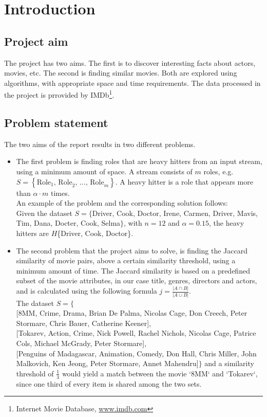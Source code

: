 
\section{Introduction}

\subsection{Project aim}
The project has two aims. The first is to discover interesting facts about actors, movies, etc. The second is finding similar movies. Both are explored using algorithms, with appropriate space and time requirements. The data processed in the project is prrovided by IMDb\footnote{Internet Movie Database, \url{www.imdb.com}}.

\subsection{Problem statement}
\label{sub:problem}
	The two aims of the report results in two different problems.
\begin{itemize}
	\item The first problem is finding roles that are heavy hitters from an input stream, using a minimum amount of space. A stream consists of \(m\) roles, e.g. \(S=\left\{\textrm{Role}_1 \textrm{, Role}_2 \textrm{, } \dots \textrm{, Role}_m\right\}\). A heavy hitter is a role that appears more than \(\alpha \cdot m\) times.\\
	An example of the problem and the corresponding solution follows: \\
	Given the dataset \(S = \{\)Driver, Cook, Doctor, Irene, Carmen, Driver, Mavis, Tim, Dana, Docter, Cook, Selma\(\}\), with \(n=12\) and \(\alpha=0.15\), the heavy hitters are \(H\)\{Driver, Cook, Doctor\}.
	\item The second problem that the project aims to solve, is finding the Jaccard similarity of movie pairs, above a certain similarity threshold, using a minimum amount of time. The Jaccard similarity is based on a predefined subset of the movie attributes, in our case title, genres, directors and actors, and is calculated using the following formula \(j = \frac{|A \cap B|}{|A \cup B|}\). \\
	The dataset \(S = \{\) \\
		{[}8MM, Crime, Drama, Brian De Palma, Nicolas Cage, Don Creech, Peter Stormare, Chris Bauer, Catherine Keener{]}, \\
		{[}Tokarev, Action, Crime, Nick Powell, Rachel Nichols, Nicolas Cage, Patrice Cols, Michael McGrady, Peter Stormare{]}, \\
		{[}Penguins of Madagascar, Animation, Comedy, Don Hall, Chris Miller, John Malkovich, Ken Jeong, Peter Stormare, Annet Mahendru{]}\(\}\)
	and a similarity threshold of \(\frac{1}{3}\) would yield a match between the movie `8MM` and `Tokarev`, since one third of every item is shared among the two sets.
	
\end{itemize}


